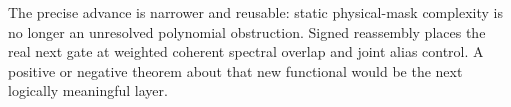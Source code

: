 The precise advance is narrower and reusable: static physical-mask
complexity is no longer an unresolved polynomial obstruction.  Signed
reassembly places the real next gate at weighted coherent spectral overlap
and joint alias control.  A positive or negative theorem about that new
functional would be the next logically meaningful layer.
